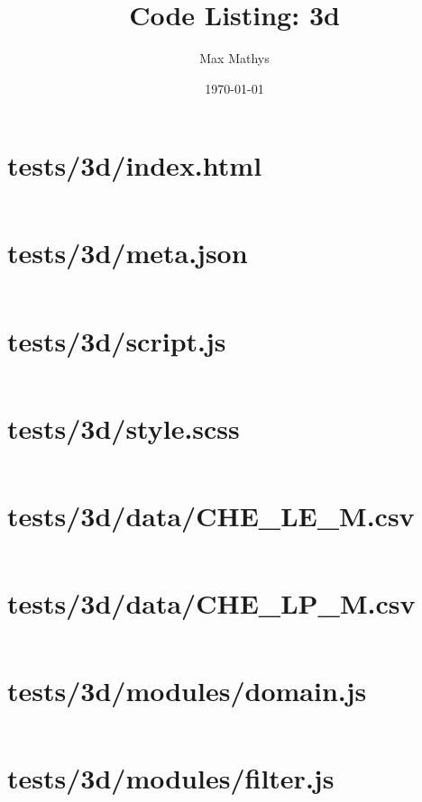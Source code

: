 \documentclass[a4paper]{article}
\title{Code Listing: 3d}
\author{Max Mathys}
\date{\today}
\begin{document}
\maketitle

\section{tests/3d/index.html}
\inputminted[linenos,breaklines,breakbytoken]{html}{tests/3d/index.html}

\section{tests/3d/meta.json}
\inputminted[linenos,breaklines,breakbytoken]{json}{tests/3d/meta.json}

\section{tests/3d/script.js}
\inputminted[linenos,breaklines,breakbytoken]{javascript}{tests/3d/script.js}

\section{tests/3d/style.scss}
\inputminted[linenos,breaklines,breakbytoken]{scss}{tests/3d/style.scss}

\section{tests/3d/data/CHE\_LE\_M.csv}
\inputminted[linenos,breaklines,breakbytoken]{text}{tests/3d/data/CHE_LE_M.csv}

\section{tests/3d/data/CHE\_LP\_M.csv}
\inputminted[linenos,breaklines,breakbytoken]{text}{tests/3d/data/CHE_LP_M.csv}

\section{tests/3d/modules/domain.js}
\inputminted[linenos,breaklines,breakbytoken]{javascript}{tests/3d/modules/domain.js}

\section{tests/3d/modules/filter.js}
\inputminted[linenos,breaklines,breakbytoken]{javascript}{tests/3d/modules/filter.js}
\end{document}
